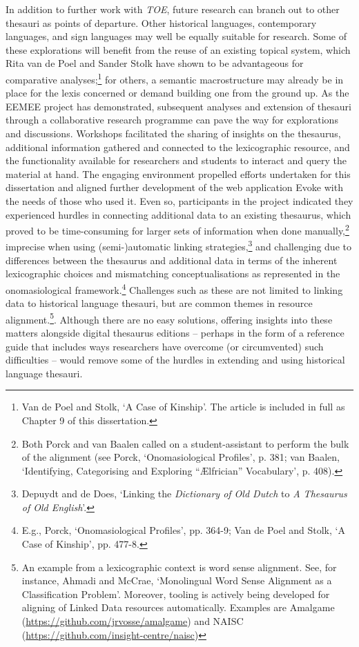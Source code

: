 In addition to further work with \textit{TOE}, future research can branch out to other thesauri as points of departure. Other historical languages, contemporary languages, and sign languages may well be equally suitable for research. Some of these explorations will benefit from the reuse of an existing topical system, which Rita van de Poel and Sander Stolk have shown to be advantageous for comparative analyses;\footnote{Van de Poel and Stolk, `A Case of Kinship'. The article is included in full as Chapter 9 of this dissertation.} for others, a semantic macrostructure may already be in place for the lexis concerned or demand building one from the ground up. As the EEMEE project has demonstrated, subsequent analyses and extension of thesauri through a collaborative research programme can pave the way for explorations and discussions. Workshops facilitated the sharing of insights on the thesaurus, additional information gathered and connected to the lexicographic resource, and the functionality available for researchers and students to interact and query the material at hand. The engaging environment propelled efforts undertaken for this dissertation and aligned further development of the web application Evoke with the needs of those who used it. Even so, participants in the project indicated they experienced hurdles in connecting additional data to an existing thesaurus, which proved to be time-consuming for larger sets of information when done manually,\footnote{Both Porck and van Baalen called on a student-assistant to perform the bulk of the alignment (see Porck, `Onomasiological Profiles', p. 381; van Baalen, `Identifying, Categorising and Exploring ``Ælfrician'' Vocabulary', p. 408).} imprecise when using (semi-)automatic linking strategies,\footnote{Depuydt and de Does, `Linking the \textit{Dictionary of Old Dutch} to \textit{A Thesaurus of Old English}'.} and challenging due to differences between the thesaurus and additional data in terms of the inherent lexicographic choices and mismatching conceptualisations as represented in the onomasiological framework.\footnote{E.g., Porck, `Onomasiological Profiles', pp. 364-9; Van de Poel and Stolk, `A Case of Kinship', pp. 477-8.} 
Challenges such as these are not limited to linking data to historical language thesauri, but are common themes in resource alignment.\footnote{An example from a lexicographic context is word sense alignment. See, for instance, Ahmadi and McCrae, `Monolingual Word Sense Alignment as a Classification Problem'. Moreover, tooling is actively being developed for aligning of Linked Data resources automatically. Examples are Amalgame (\url{https://github.com/jrvosse/amalgame}) and NAISC (\url{https://github.com/insight-centre/naisc})}. 
Although there are no easy solutions, offering insights into these matters alongside digital thesaurus editions -- perhaps in the form of a reference guide that includes ways researchers have overcome (or circumvented) such difficulties -- would remove some of the hurdles in extending and using historical language thesauri.

